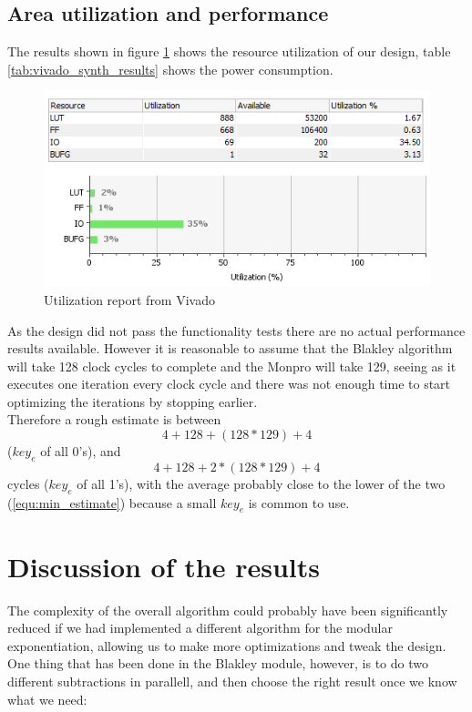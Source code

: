 \subsection{Area utilization and performance}
The results shown in figure \ref{fig:utilization} shows the resource utilization of our design, table \ref{tab:vivado_synth_results} shows the power consumption.
\begin{figure}[H]
\centering
\includegraphics[width=\textwidth]{images/Vivado_utilization}
\caption{Utilization report from Vivado}
\label{fig:utilization}
\end{figure}

As the design did not pass the functionality tests there are no actual performance results available. However it is reasonable to assume that the Blakley algorithm will take 128 clock cycles to complete and the Monpro will take 129, seeing as it executes one iteration every clock cycle and there was not enough time to start optimizing the iterations by stopping earlier.\\
Therefore a rough estimate is between 
\begin{equation}
\label{equ:min_estimate}
    4+128+(128*129)+4
\end{equation} ($key_e$ of all 0's), and 
\begin{equation}
    4+128+2*(128*129)+4
\end{equation} cycles ($key_e$ of all 1's), with the average probably close to the lower of the two (\ref{equ:min_estimate}) because a small $key_e$ is common to use.


\section{Discussion of the results}
The complexity of the overall algorithm could probably have been significantly reduced if we had implemented a different algorithm for the modular exponentiation, allowing us to make more optimizations and tweak the design. \\
One thing that has been done in the Blakley module, however, is to do two different subtractions in parallell, and then choose the right result once we know what we need:

